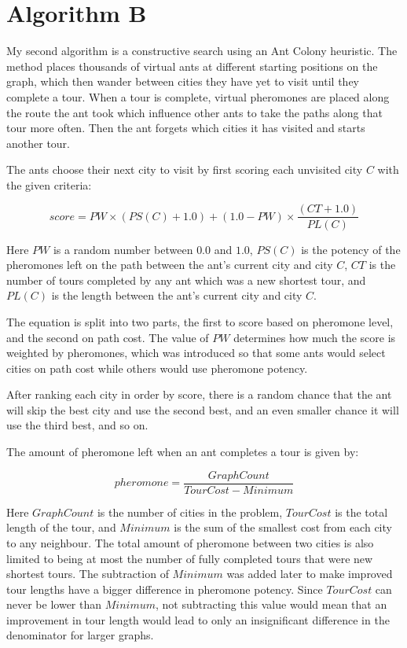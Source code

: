 \documentclass[a4paper,11pt]{article}
\begin{document}
\section{Algorithm B}
My second algorithm is a constructive search using an Ant Colony heuristic.
The method places thousands of virtual ants at different starting positions on
the graph, which then wander between cities they have yet to visit until they
complete a tour. When a tour is complete, virtual pheromones are placed along
the route the ant took which influence other ants to take the paths along that
tour more often. Then the ant forgets which cities it has visited and starts
another tour.

The ants choose their next city to visit by first scoring each unvisited city
$C$ with the given criteria:

$$score = PW \times (PS(C) + 1.0)+(1.0 - PW) \times \frac{(CT + 1.0)}{PL(C)}$$

Here $PW$ is a random number between $0.0$ and $1.0$,
$PS(C)$ is the potency of the pheromones left on the path between
the ant's current city and city $C$, $CT$ is the number of tours
completed by any ant which was a new shortest tour, and $PL(C)$ is the
length between the ant's current city and city $C$.

The equation is split into two parts, the first to score based on pheromone
level, and the second on path cost. The value of $PW$ determines how much the
score is weighted by pheromones, which was introduced so that some ants would
select cities on path cost while others would use pheromone potency.

After ranking each city in order by score, there is a random chance that the
ant will skip the best city and use the second best, and an even smaller chance
it will use the third best, and so on.

The amount of pheromone left when an ant completes a tour is given by:

$$pheromone = \frac{GraphCount}{TourCost - Minimum}$$

Here $GraphCount$ is the number of cities in the problem, $TourCost$ is the
total length of the tour, and $Minimum$ is the sum of the smallest cost from
each city to any neighbour. The total amount of pheromone between two cities is
also limited to being at most the number of fully completed tours that were new
shortest tours. The subtraction of $Minimum$ was added later to make improved
tour lengths have a bigger difference in pheromone potency. Since $TourCost$
can never be lower than $Minimum$, not subtracting this value would mean that
an improvement in tour length would lead to only an insignificant difference in
the denominator for larger graphs.
\end{document}
